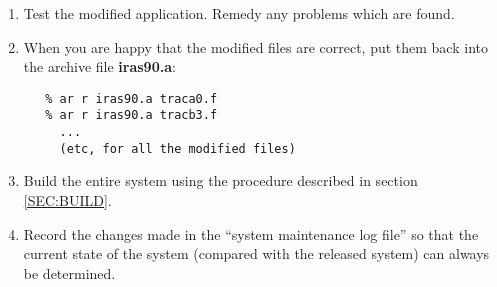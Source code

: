 \begin{enumerate}
\item Test the modified application. Remedy any problems which are found.

\item When you are happy that the modified files are correct, put them back into
the archive file {\bf iras90.a}:

\small 
\begin{verbatim}
   % ar r iras90.a traca0.f
   % ar r iras90.a tracb3.f
     ...
     (etc, for all the modified files)
\end{verbatim}
\normalsize

\item Build the entire system using the procedure described in section 
\ref{SEC:BUILD}.

\item Record the changes made in the ``system maintenance log file'' so that the
current state of the system (compared with the released system) can always be
determined. 

\end{enumerate}

